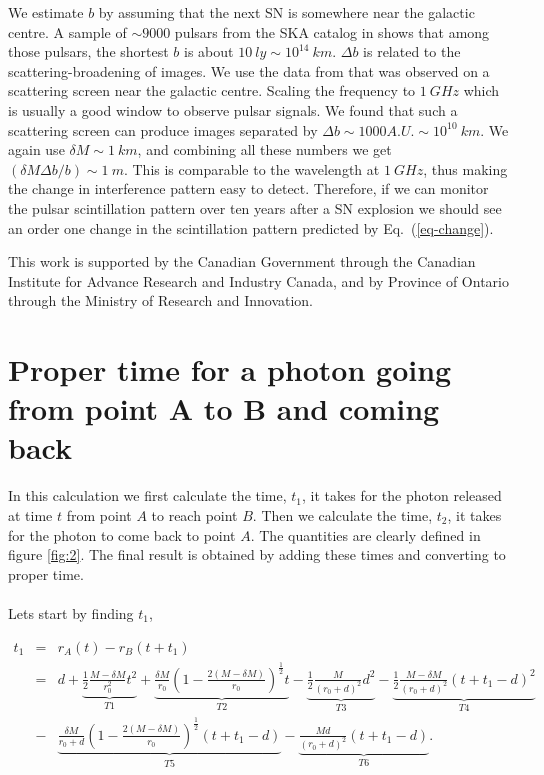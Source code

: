 \documentclass[aps,showpacs,onecolumn,floats,prd,superscriptaddress,nofootinbib]{revtex4-1}
\begin{document}
We estimate $b$ by assuming that the next SN is somewhere near the galactic centre. A sample of $\sim 9000$ pulsars from the SKA catalog in \cite{MSPpopulation} shows that among those pulsars, the shortest $b$ is about $10\ ly \sim 10^{14} \ km$. $\Delta b$ is related to the scattering-broadening of images. We use the data from \cite{BowBel13} that was observed on a scattering screen near the galactic centre. Scaling the frequency to $1\ GHz$ which is usually a good window to observe pulsar signals. We found that such a scattering screen can produce images separated by $\Delta b\sim 1000A.U. \sim 10^{10} \ km$. We again use $\delta M \sim 1 \ km$, and combining all these numbers we get $(\delta M \Delta b / b) \sim 1 \ m$. This is comparable to the wavelength at $1 \ GHz$, thus making the change in interference pattern easy to detect. Therefore, if we can monitor the pulsar scintillation pattern over ten years after a SN explosion we should see an order one change in the scintillation pattern predicted by Eq.~(\ref{eq-change}).

\acknowledgments

This work is supported by the Canadian Government through the Canadian Institute for Advance Research and Industry Canada, and by Province of Ontario through the Ministry of Research and Innovation.

\appendix

\section{Proper time for a photon going from point A to B and coming back}

In this calculation we first calculate the time, $t_1$, it takes for the photon released at time $t$ from point $A$ to reach point $B$. Then we calculate the time, $t_2$, it takes for the photon to come back to point $A$. The quantities are clearly defined in figure \ref{fig:2}. The final result is obtained by adding these times and converting to proper time. 
\\
\\
Lets start by finding $t_1$,

\begin{eqnarray}
	t_1 & = & r_A(t) -  r_B(t + t_1) 	\nonumber	\\
	& = & d + \underbrace{\frac{1}{2} \frac{M-\delta M}{r_0^2} t^2}_{T1} + \underbrace{\frac{\delta M}{r_0} \left( 1 - \frac{2(M-\delta M)}{r_0} \right)^\frac{1}{2} t}_{T2} - \underbrace{\frac{1}{2} \frac{M}{(r_0+d)^2} d^2}_{T3} - \underbrace{\frac{1}{2} \frac{M- \delta M}{(r_0+d)^2} (t+t_1-d)^2}_{T4}	\nonumber	\\
	& - & \underbrace{\frac{\delta M}{r_0 + d} \left( 1 - \frac{2(M-\delta M)}{r_0} \right)^\frac{1}{2} (t+t_1-d)}_{T5} - \underbrace{\frac{M d}{(r_0+d)^2} (t + t_1 -d)}_{T6}.	\label{t1full}
\end{eqnarray}
\end{document}
